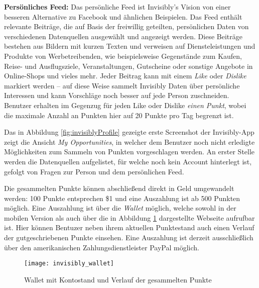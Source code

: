 \noindent \textbf{Persönliches Feed:} Das persönliche Feed ist Invisibly's Vision von einer besseren Alternative zu Facebook und ähnlichen Beispielen. Das Feed enthält relevante Beiträge, die auf Basis der freiwillig geteilten, persönlichen Daten von verschiedenen Datenquellen ausgewählt und angezeigt werden. Diese Beiträge bestehen aus Bildern mit kurzen Texten und verweisen auf Diensteleistungen und Produkte von Werbetreibenden, wie beispielsweise Gegenstände zum Kaufen, Reise- und Ausflugsziele, Veranstaltungen, Gutscheine oder sonstige Angebote in Online-Shops und vieles mehr. Jeder Beitrag kann mit einem \textit{Like} oder \textit{Dislike} markiert werden -- auf diese Weise sammelt Invisibly Daten über persönliche Interessen und kann Vorschläge noch besser auf jede Person zuschneiden. Benutzer erhalten im Gegenzug für jeden Like oder Dislike \textit{einen Punkt}, wobei die maximale Anzahl an Punkten hier auf 20 Punkte pro Tag begrenzt ist. \cite{invisiblyWhyPay_2021} \newline

\noindent Das in Abbildung \ref{fig:invisiblyProfile} gezeigte erste Screenshot der Invisibly-App zeigt die Ansicht \textit{My Opportunities}, in welcher dem Benutzer noch nicht erledigte Möglichkeiten zum Sammeln von Punkten vorgeschlagen werden. An erster Stelle werden die Datenquellen aufgelistet, für welche noch kein Account hinterlegt ist, gefolgt von Fragen zur Person und dem persönlichen Feed. \newline

\noindent Die gesammelten Punkte können abschließend direkt in Geld umgewandelt werden: 100 Punkte entsprechen \$1 und eine Auszahlung ist ab 500 Punkten möglich. \cite{invisiblyWhyPay_2021} Eine Auszahlung ist über die \textit{Wallet} möglich, welche sowohl in der mobilen Version als auch über die in Abbildung \ref{fig:invisiblyWallet} dargestellte Webseite aufrufbar ist. Hier können Bentuzer neben ihrem aktuellen Punktestand auch einen Verlauf der gutgeschriebenen Punkte einsehen. Eine Auszahlung ist derzeit ausschließlich über den amerikanischen Zahlungsdienstleister PayPal möglich. \newline

\begin{figure}[!ht]
	\centering
	\texttt{[image: invisibly\_wallet]}
	\caption{Wallet mit Kontostand und Verlauf der gesammelten Punkte \cite{behanceInvisibly_2021}}
	\label{fig:invisiblyWallet}
\end{figure}

